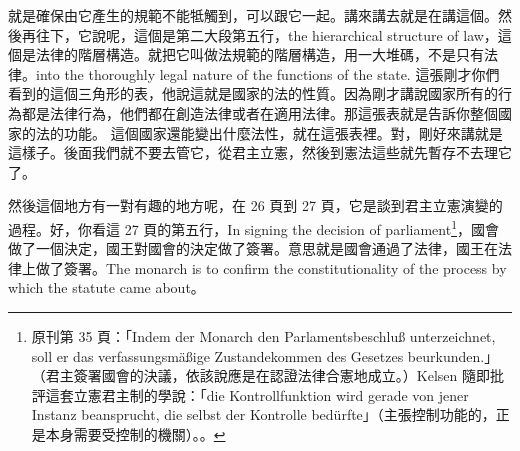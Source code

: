 \hypertarget{w05:cue:79}{}就是確保由它產生的規範不能牴觸到，可以跟它一起。講來講去就是在講這個。然後再往下，它說呢，這個是第二大段第五行，the hierarchical structure of law，這個是法律的階層構造。就把它叫做法規範的階層構造，用一大堆碼，不是只有法律。into the thoroughly legal nature of the functions of the state.
\hypertarget{w05:cue:80}{}這張剛才你們看到的這個三角形的表，他說這就是國家的法的性質。因為剛才講說國家所有的行為都是法律行為，他們都在創造法律或者在適用法律。那這張表就是告訴你整個國家的法的功能。
\hypertarget{w05:cue:81}{}這個國家還能變出什麼法性，就在這張表裡。對，剛好來講就是這樣子。後面我們就不要去管它，從君主立憲，然後到憲法這些就先暫存不去理它了。

\hypertarget{w05:cue:82}{}然後這個地方有一對有趣的地方呢，在 26 頁到 27 頁，它是談到君主立憲演變的過程。好，你看這 27 頁的第五行，In signing the decision of parliament\footnote{原刊第 35 頁：「Indem der Monarch den Parlamentsbeschluß unterzeichnet, soll er das verfassungsmäßige Zustandekommen des Gesetzes beurkunden.」（君主簽署國會的決議，依該說應是在認證法律合憲地成立。）Kelsen 隨即批評這套立憲君主制的學說：「die Kontrollfunktion wird gerade von jener Instanz beansprucht, die selbst der Kontrolle bedürfte」（主張控制功能的，正是本身需要受控制的機關）。\cite[35]{kelsen1929}。}，國會做了一個決定，國王對國會的決定做了簽署。意思就是國會通過了法律，國王在法律上做了簽署。The monarch is to confirm the constitutionality of the process by which the statute came about。

